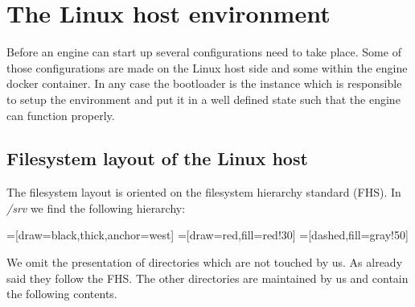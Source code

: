 \chapter{The Linux host environment}
Before an engine can start up several configurations need to take place. Some of those configurations are made on the Linux host side and some
within the engine docker container. In any case the bootloader is the instance which is responsible to setup the environment and put it in a well
defined state such that the engine can function properly.
	\section{Filesystem layout of the Linux host}\label{p01:ch021}
	The filesystem layout is oriented on the filesystem hierarchy standard (FHS). In \emph{/srv} we find the following hierarchy:
	
	=[draw=black,thick,anchor=west]
	=[draw=red,fill=red!30]
	=[dashed,fill=gray!50]
	
	We omit the presentation of directories which are not touched by us. As already said they follow the FHS. The other directories are maintained by us and contain the following contents.
